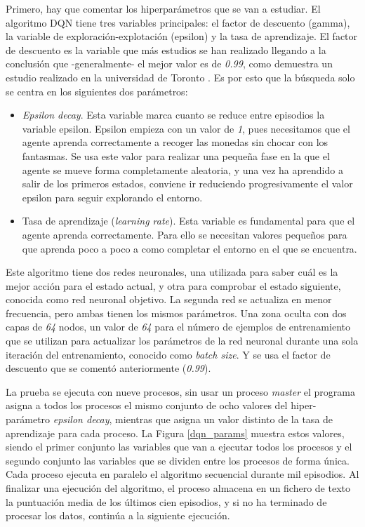 Primero, hay que comentar los hiperparámetros que se van a estudiar. El algoritmo DQN tiene tres variables principales: el factor de descuento (gamma), la variable de exploración-explotación (epsilon) y la tasa de aprendizaje. El factor de descuento es la variable que más estudios se han realizado llegando a la conclusión que -generalmente- el mejor valor es de \textit{0.99}, como demuestra un estudio realizado en la universidad de Toronto \cite{pitis2019rethinking}. Es por esto que la búsqueda solo se centra en los siguientes dos parámetros:

\begin{itemize}
	\item \textit{Epsilon decay}. Esta variable marca cuanto se reduce entre episodios la variable epsilon. Epsilon empieza con un valor de \textit{1}, pues necesitamos que el agente aprenda correctamente a recoger las monedas sin chocar con los fantasmas. Se usa este valor para realizar una pequeña fase en la que el agente se mueve forma completamente aleatoria, y una vez ha aprendido a salir de los primeros estados, conviene ir reduciendo progresivamente el valor epsilon para seguir explorando el entorno. 
	
	\item Tasa de aprendizaje (\textit{learning rate}). Esta variable es fundamental para que el agente aprenda correctamente. Para ello se necesitan valores pequeños para que aprenda poco a poco a como completar el entorno en el que se encuentra.
\end{itemize}

Este algoritmo tiene dos redes neuronales, una utilizada para saber cuál es la mejor acción para el estado actual, y otra para comprobar el estado siguiente, conocida como red neuronal objetivo. La segunda red se actualiza en menor frecuencia, pero ambas tienen los mismos parámetros. Una zona oculta con dos capas de \textit{64} nodos, un valor de \textit{64} para el número de ejemplos de entrenamiento que se utilizan para actualizar los parámetros de la red neuronal durante una sola iteración del entrenamiento, conocido como \textit{batch size}. Y se usa el factor de descuento que se comentó anteriormente (\textit{0.99}). 				


La prueba se ejecuta con nueve procesos, sin usar un proceso \textit{master} el programa asigna a todos los procesos el mismo conjunto de ocho valores del hiper-parámetro \textit{epsilon decay}, mientras que asigna un valor distinto de la tasa de aprendizaje para cada proceso. La Figura \ref{dqn_params} muestra estos valores, siendo el primer conjunto las variables que van a ejecutar todos los procesos y el segundo conjunto las variables que se dividen entre los procesos de forma única. Cada proceso ejecuta en paralelo el algoritmo secuencial durante mil episodios. Al finalizar una ejecución del algoritmo, el proceso almacena en un fichero de texto la puntuación media de los últimos cien episodios, y si no ha terminado de procesar los datos, continúa a la siguiente ejecución.

